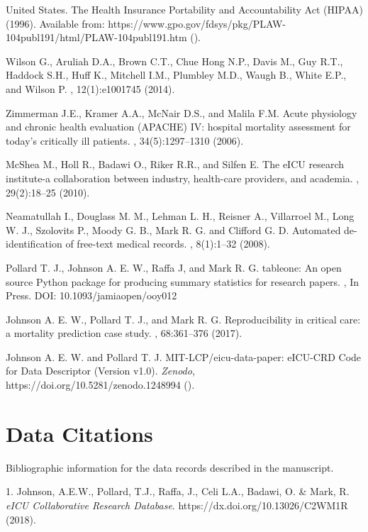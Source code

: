 \documentclass[english]{article}
\begin{document}
\begin{thebibliography}{1}
United States.
\newblock The Health Insurance Portability and Accountability Act (HIPAA) (1996).
\newblock Available from: https://www.gpo.gov/fdsys/pkg/PLAW-104publ191/html/PLAW-104publ191.htm ().

Wilson G., Aruliah D.A., Brown C.T., Chue Hong N.P., Davis M., Guy R.T., Haddock S.H., Huff K., Mitchell I.M., Plumbley M.D., Waugh B., White E.P., and Wilson P.
, 12(1):e1001745 (2014).

Zimmerman J.E., Kramer A.A., McNair D.S., and Malila F.M.
\newblock Acute physiology and chronic health evaluation ({APACHE}) {IV}: hospital
  mortality assessment for today’s critically ill patients.
, 34(5):1297--1310 (2006).

McShea M., Holl R., Badawi O., Riker R.R., and Silfen E.
\newblock The {eICU} research institute-a collaboration between industry, health-care providers, and academia.
, 29(2):18--25 (2010).

Neamatullah I., Douglass M. M., Lehman L. H., Reisner A., Villarroel M., Long W. J., Szolovits P., Moody G. B., Mark R. G. and Clifford G. D.
\newblock Automated de-identification of free-text medical records.
, 8(1):1--32 (2008).

Pollard T. J., Johnson A. E. W., Raffa J, and Mark R. G.
\newblock tableone: An open source Python package for producing summary statistics for research papers.
, In Press. DOI: 10.1093/jamiaopen/ooy012

Johnson A. E. W., Pollard T. J., and Mark R. G.
\newblock Reproducibility in critical care: a mortality prediction case study.
, 68:361--376 (2017).

Johnson A. E. W. and Pollard T. J.
\newblock MIT-LCP/eicu-data-paper: eICU-CRD Code for Data Descriptor (Version v1.0).
\newblock \emph{Zenodo}, https://doi.org/10.5281/zenodo.1248994 ().

\end{thebibliography}

\section*{Data Citations}

Bibliographic information for the data records described in the manuscript.

1. Johnson, A.E.W., Pollard, T.J., Raffa, J., Celi L.A., Badawi, O. \& Mark, R. \emph{eICU Collaborative Research Database}. https://dx.doi.org/10.13026/C2WM1R (2018).
\end{document}
